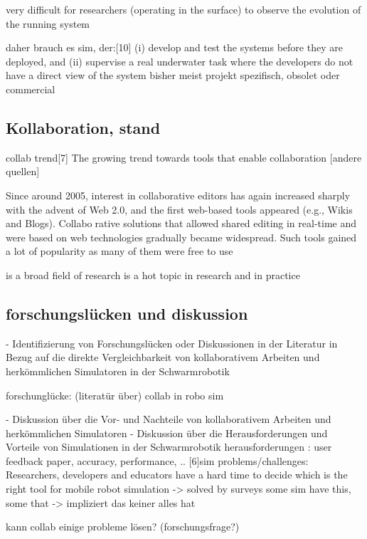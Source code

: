 \documentclass[german,version-2020-11]{uzl-thesis}
\begin{document}
        very difficult for researchers (operating in the surface) to observe the evolution of the running system

  daher brauch es sim, der:[10]
    (i) develop and test the systems before they are deployed, and 
    (ii) supervise a real underwater task where the developers do not have a direct view of the system
  bisher meist  projekt spezifisch, obsolet oder commercial

  
\subsection{Kollaboration, stand}
collab trend[7]
    The growing trend towards tools that enable collaboration [andere quellen]
    
    Since around 2005, interest in collaborative editors has again increased sharply with the advent of Web 2.0, and the first web-based tools appeared (e.g., Wikis and Blogs). Collaborative solutions that allowed shared editing in real-time and were based on web technologies gradually became widespread. Such tools gained a lot of popularity as many of them were free to use
    
    is a broad field of research
    is a hot topic in research and in practice

    
\subsection{forschungslücken und diskussion}

- Identifizierung von Forschungslücken oder Diskussionen in der Literatur in Bezug auf die direkte Vergleichbarkeit 
von kollaborativem Arbeiten und herkömmlichen Simulatoren in der Schwarmrobotik

forschunglücke: (literatür über) collab in robo sim 



- Diskussion über die Vor- und Nachteile von kollaborativem Arbeiten und herkömmlichen Simulatoren
- Diskussion über die Herausforderungen und Vorteile von Simulationen in der Schwarmrobotik
    herausforderungen : user feedback paper, accuracy, performance, ..
    [6]sim problems/challenges:
      Researchers, developers and educators have a hard time to decide which is the right tool for mobile robot simulation -> solved by surveys
      some sim have this, some that -> impliziert das keiner alles hat

      kann collab einige probleme lösen? (forschungsfrage?)
\end{document}
